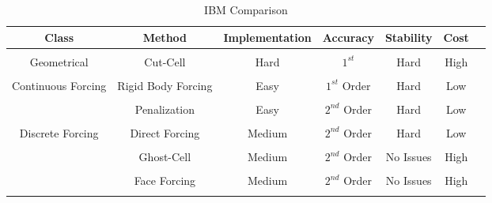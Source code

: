 
\begin{table}[htp!]
\centering
\caption{IBM Comparison}
\label{tab:IBM_MODELS}
\begin{tabular}{ccccccc}
\hline
Class & Method & Implementation & Accuracy & Stability
 & Cost \\
\hline
\hline
\\

Geometrical & Cut-Cell & Hard & $1^{st}$ & Hard & High \\

\\

\multirow{3}{*}{Continuous Forcing} & Rigid Body Forcing & Easy & $1^{st}$ Order & Hard & Low \\ \\

& Penalization & Easy & $2^{nd}$ Order & Hard & Low \\

\\

\multirow{5}{*}{Discrete Forcing} & Direct Forcing & Medium & $2^{nd}$ Order & Hard & Low  \\ \\
& Ghost-Cell & Medium & $2^{nd}$ Order  & No Issues  & High \\ \\
& Face Forcing & Medium & $2^{nd}$ Order & No Issues & High \\ \\ 
\hline
\end{tabular}
\end{table}
